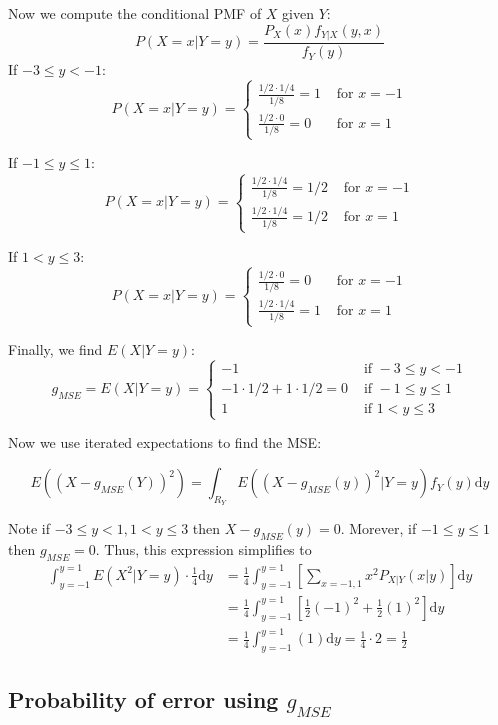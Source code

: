 \documentclass[paper=a4, fontsize=11pt]{scrartcl} %
\numberwithin{equation}{section} %
\numberwithin{figure}{section} %
\numberwithin{table}{section} %
\begin{document}
Now we compute the conditional PMF of $X$ given $Y$:
\[ P(X = x | Y = y) = \frac{P_X(x) f_{Y|X}(y, x)}{f_Y(y)}\]
If $-3 \leq y < -1$:
\[
P(X = x| Y= y) =
\begin{cases}
   \frac{1/2 \cdot 1/4}{1/8} = 1 & \textrm{ for } x = -1 \\
   \frac{1/2 \cdot 0}{1/8} = 0 & \textrm{ for } x = 1
\end{cases}
\]

If $-1 \leq y \leq 1$:
\[
P(X = x| Y= y) =
\begin{cases}
   \frac{1/2 \cdot 1/4}{1/8} = 1/2 & \textrm{ for } x = -1 \\
   \frac{1/2 \cdot 1/4}{1/8} = 1/2 & \textrm{ for } x = 1
\end{cases}
\]

If $1 < y \leq 3$:
\[
P(X = x| Y= y) =
\begin{cases}
   \frac{1/2 \cdot 0}{1/8} = 0 & \textrm{ for } x = -1 \\
   \frac{1/2 \cdot 1/4}{1/8} = 1 & \textrm{ for } x = 1
\end{cases}
\]

Finally, we find $E(X | Y = y)$:
\[
g_{MSE} = E(X | Y = y) =
\begin{cases}
   -1 & \textrm{ if } -3 \leq y < -1 \\
   -1 \cdot 1/2 + 1 \cdot 1/2 = 0 & \textrm{ if } -1 \leq y \leq 1 \\
   1 & \textrm{ if } 1 < y \leq 3
\end{cases}
\]

Now we use iterated expectations to find the MSE:

\[ E\left( (X - g_{MSE}(Y))^2 \right) = \int_{R_Y} E\left( (X -  g_{MSE}(y))^2 | Y = y \right) f_Y(y) \textrm{d}y \]

Note if $-3 \leq y < 1, 1 < y \leq 3$ then $X - g_{MSE}(y) = 0$. Morever, if $-1 \leq y \leq 1$ then $g_{MSE} = 0$. Thus, this expression simplifies to
\begin{align*}
\int_{y = -1}^{y = 1} E(X^2 | Y = y) \cdot \frac{1}{4} \textrm{d}y &=  \frac{1}{4} \int_{y = -1}^{y = 1}\left[ \sum_{x = -1, 1} x^2 P_{X|Y}(x | y) \right] \textrm{d}y \\
   &=  \frac{1}{4} \int_{y = -1}^{y = 1}\left[\frac{1}{2} (-1)^2 + \frac{1}{2} (1)^2\right] \textrm{d}y \\
   &=  \frac{1}{4} \int_{y = -1}^{y = 1}(1) \textrm{d}y = \frac{1}{4} \cdot 2 = \frac{1}{2} 
\end{align*}

\subsection{Probability of error using $g_{MSE}$}
\end{document}
